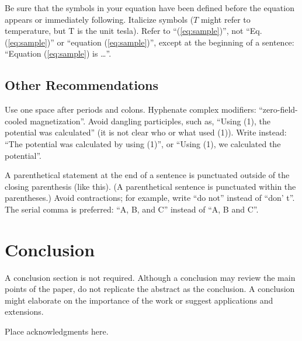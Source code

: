 Be sure that the symbols in your equation have been defined before the
equation appears or immediately following. Italicize symbols ($T$
might refer to temperature, but T is the unit tesla). Refer to
``(\ref{eq:sample})'', not ``Eq. (\ref{eq:sample})'' or ``equation
(\ref{eq:sample})'', except at the beginning of a sentence: ``Equation
(\ref{eq:sample}) is \ldots''.

\subsection{Other Recommendations}

Use one space after periods and colons. Hyphenate complex modifiers:
``zero-field-cooled magnetization''. Avoid dangling participles, such
as, ``Using (1), the potential was calculated'' (it is not clear who or
what used (1)). Write instead: ``The potential was calculated by using
(1)'', or ``Using (1), we calculated the potential''.

A parenthetical statement at the end of a sentence is punctuated
outside of the closing parenthesis (like this). (A parenthetical
sentence is punctuated within the parentheses.) Avoid contractions;
for example, write ``do not'' instead of ``don' t''. The serial comma
is preferred: ``A, B, and C'' instead of ``A, B and C''.


\section{Conclusion}

A conclusion section is not required. Although a conclusion may review
the main points of the paper, do not replicate the abstract as the
conclusion. A conclusion might elaborate on the importance of the work
or suggest applications and extensions.

\begin{ack}
Place acknowledgments here.
\end{ack}

                                                   


